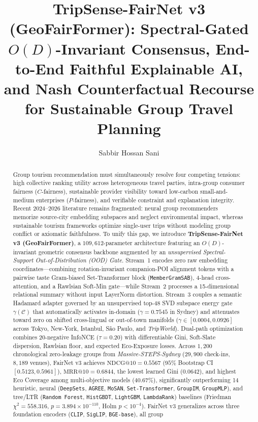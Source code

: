 \documentclass[final,5p,twocolumn]{elsarticle}
\begin{document}
\begin{frontmatter}

\title{TripSense-FairNet v3 (GeoFairFormer): Spectral-Gated $O(D)$-Invariant Consensus, End-to-End Faithful Explainable AI, and Nash Counterfactual Recourse for Sustainable Group Travel Planning}

\author[diu]{Sabbir Hossan Sani}

\begin{abstract}
Group tourism recommendation must simultaneously resolve four competing tensions: high collective ranking utility across heterogeneous travel parties, intra-group consumer fairness ($C$-fairness), sustainable provider visibility toward low-carbon small-and-medium enterprises ($P$-fairness), and verifiable constraint and explanation integrity. Recent 2024--2026 literature remains fragmented: neural group recommenders memorize source-city embedding subspaces and neglect environmental impact, whereas sustainable tourism frameworks optimize single-user trips without modeling group conflict or axiomatic faithfulness. To unify this gap, we introduce \textbf{TripSense-FairNet v3 (GeoFairFormer)}, a $109{,}612$-parameter architecture featuring an $O(D)$-invariant geometric consensus backbone augmented by an \emph{unsupervised Spectral-Support Out-of-Distribution (OOD) Gate}. Stream~1 encodes zero raw embedding coordinates---combining rotation-invariant companion-POI alignment tokens with a pairwise taste Gram-biased Set-Transformer block (\texttt{MemberGramSAB}), 4-head cross-attention, and a Rawlsian Soft-Min gate---while Stream~2 processes a 15-dimensional relational summary without input LayerNorm distortion. Stream~3 couples a semantic Hadamard adapter governed by an unsupervised top-48 SVD subspace energy gate $\gamma(\mathcal{C})$ that automatically activates in-domain ($\gamma{=}0.7545$ in Sydney) and attenuates toward zero on shifted cross-lingual or out-of-town manifolds ($\gamma \in [0.0004, 0.0926]$ across Tokyo, New-York, Istanbul, S\~{a}o Paulo, and \textit{TripWorld}). Dual-path optimization combines 20-negative InfoNCE ($\tau{=}0.20$) with differentiable Gini, Soft-Slate dispersion, Rawlsian floor, and expected Eco-Exposure losses. Across $1{,}200$ chronological zero-leakage groups from \textit{Massive-STEPS-Sydney} ($29{,}900$ check-ins, $8{,}189$ venues), FairNet v3 achieves $\text{NDCG@10} = 0.5567$ ($95\%$ Bootstrap CI $[0.5123, 0.5961]$), $\text{MRR@10} = 0.6844$, the lowest learned Gini ($0.0642$), and highest Eco Coverage among multi-objective models ($40.67\%$), significantly outperforming 14 heuristic, neural (\texttt{DeepSets}, \texttt{AGREE}, \texttt{MoSAN}, \texttt{Set-Transformer}, \texttt{GroupIM}, \texttt{GroupMLP}), and tree/LTR (\texttt{Random Forest}, \texttt{HistGBDT}, \texttt{LightGBM}, \texttt{LambdaRank}) baselines (Friedman $\chi^2 = 558.316$, $p = 3.894 \times 10^{-110}$, Holm $p < 10^{-4}$). FairNet v3 generalizes across three foundation encoders (\texttt{CLIP}, \texttt{SigLIP}, \texttt{BGE-base}), all group 
\end{abstract}
\end{frontmatter}
\end{document}

